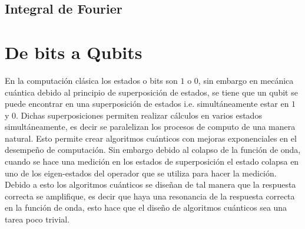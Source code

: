 \documentclass[a4paper]{article}
\begin{document}
\subsection{Integral de Fourier}
\section{De bits a Qubits}
En la computación clásica los estados o bits son $1$ o $0$, sin embargo en mecánica cuántica debido al principio de superposición de estados, se tiene que un qubit se puede encontrar en una superposición de estados i.e. simultáneamente estar en $1$ y $0$. Dichas superposiciones permiten realizar cálculos en varios estados simultáneamente, es decir se paralelizan los procesos de computo de una manera natural. Esto permite crear algoritmos cuánticos con mejoras exponenciales en el desempeño de computación. Sin embargo debido al colapso de la función de onda, cuando se hace una medición en los estados de superposición el estado colapsa en uno de los eigen-estados del operador que se utiliza para hacer la medición. \\
Debido a esto los algoritmos cuánticos se diseñan de tal manera que la respuesta correcta se amplifique, es decir que haya una resonancia de la respuesta correcta en la función de onda, esto hace que el diseño de algoritmos cuánticos sea una tarea poco trivial.
\end{document}
